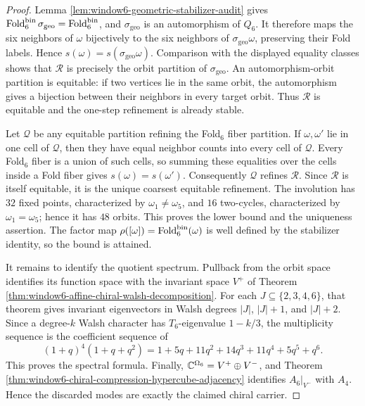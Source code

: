 \begin{proof}
Lemma \ref{lem:window6-geometric-stabilizer-audit} gives
\(\operatorname{Fold}_6^{\mathrm{bin}}\sigma_{\mathrm{geo}}=
\operatorname{Fold}_6^{\mathrm{bin}}\), and \(\sigma_{\mathrm{geo}}\) is an automorphism of
\(Q_6\).  It therefore maps the six neighbors of \(\omega\) bijectively to
the six neighbors of \(\sigma_{\mathrm{geo}}\omega\), preserving their Fold
labels.  Hence \(s(\omega)=s(\sigma_{\mathrm{geo}}\omega)\).  Comparison with
the displayed equality classes shows that \(\mathcal R\) is precisely the
orbit partition of \(\sigma_{\mathrm{geo}}\).  An automorphism-orbit partition
is equitable: if two vertices lie in the same orbit, the automorphism gives a
bijection between their neighbors in every target orbit.  Thus \(\mathcal R\)
is equitable and the one-step refinement is already stable.

Let \(\mathcal Q\) be any equitable partition refining the Fold\(_6\) fiber
partition.  If \(\omega,\omega'\) lie in one cell of \(\mathcal Q\), then they
have equal neighbor counts into every cell of \(\mathcal Q\).  Every
Fold\(_6\) fiber is a union of such cells, so summing these equalities over the
cells inside a Fold fiber gives \(s(\omega)=s(\omega')\).  Consequently
\(\mathcal Q\) refines \(\mathcal R\).  Since \(\mathcal R\) is itself
equitable, it is the unique coarsest equitable refinement.  The involution has
\(32\) fixed points, characterized by \(\omega_1\ne\omega_5\), and \(16\)
two-cycles, characterized by \(\omega_1=\omega_5\); hence it has \(48\)
orbits.  This proves the lower bound and the uniqueness assertion.  The factor
map \(\rho([\omega])=\operatorname{Fold}_6^{\mathrm{bin}}(\omega)\) is well defined by the
stabilizer identity, so the bound is attained.

It remains to identify the quotient spectrum.  Pullback from the orbit space
identifies its function space with the invariant space \(V^+\) of Theorem
\ref{thm:window6-affine-chiral-walsh-decomposition}.  For each
\(J\subseteq\{2,3,4,6\}\), that theorem gives invariant eigenvectors in Walsh
degrees \(|J|\), \(|J|+1\), and \(|J|+2\).  Since a degree-\(k\) Walsh
character has \(T_6\)-eigenvalue \(1-k/3\), the multiplicity sequence is the
coefficient sequence of
\[
(1+q)^4(1+q+q^2)
=1+5q+11q^2+14q^3+11q^4+5q^5+q^6.
\]
This proves the spectral formula.  Finally,
\(\mathbb{C}^{\Omega_6}=V^+\oplus V^-\), and Theorem
\ref{thm:window6-chiral-compression-hypercube-adjacency} identifies
\(A_6|_{V^-}\) with \(A_4\).  Hence the discarded modes are exactly the
claimed chiral carrier. \qedhere
\end{proof}
